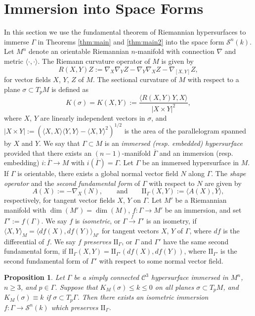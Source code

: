 \documentclass[11pt]{amsart}
\newtheorem{proposition}[theorem]{Proposition}
\theoremstyle{definition}
\newcommand{\ol}{\overline}
\newcommand{\C}{\mathcal{C}}
\newcommand{\ff}{\mathrm{I\!I}}
\begin{document}
\section{Immersion into Space Forms}\label{sec:immersion}
In this section we use the fundamental theorem of Riemannian hypersurfaces \cites{spivak:v4,dajczer1990} to immerse $\Gamma$ in Theorems \ref{thm:main} and \ref{thm:main2}  into the space form $\mathcal{S}^n(k)$.
Let $M^n$ denote an orientable Riemannian $n$-manifold with connection $\nabla$ and metric $\langle\cdot,\cdot\rangle$.
The Riemann curvature operator of $M$ is given by
$$
R(X,Y)Z:=\nabla_X\nabla_Y Z-\nabla_Y\nabla_X Z-\nabla_{[X,Y]}Z,
$$
for vector fields $X$, $Y$, $Z$ of $M$. The sectional curvature of $M$ with respect to a plane $\sigma\subset T_p M$ is defined as
$$
K(\sigma)=K(X,Y):=\frac{\langle R(X,Y)Y,X\rangle}{|X\times Y|^2},
$$
where $X$, $Y$  are linearly independent vectors in $\sigma$,  and $|X\times Y|:=(\langle X,X\rangle\langle Y,Y\rangle-\langle X,Y\rangle^2)^{1/2}$ is the area of the parallelogram spanned by $X$ and $Y$. We say that $\Gamma\subset M$ is an \emph{immersed (resp. embedded) hypersurface} provided that there exists an $(n-1)$-manifold $\ol\Gamma$ and an immersion  (resp. embedding) $i\colon\ol\Gamma\to M$ with $i(\ol\Gamma)=\Gamma$. Let $\Gamma$ be an immersed hypersurface in $M$. If $\Gamma$ is orientable, there exists a global normal vector field $N$ along $\Gamma$. The \emph{shape operator} and the \emph{second fundamental form} of $\Gamma$ with respect to $N$ are given by
$$
A(X):=-\nabla_X(N),\quad\quad\text{and}\quad\quad \ff_\Gamma(X,Y):=\langle A(X),Y\rangle,
$$
respectively, for tangent vector fields $X$, $Y$ on $\Gamma$. Let $M'$ be a Riemannian manifold with $\dim(M')=\dim(M)$, $f\colon\Gamma\to M'$ be an immersion, and set $\Gamma':=f(\Gamma)$. We say $f$ is \emph{isometric}, or $\Gamma\overset{f}{\to}\Gamma'$ is an isometry, if $\langle X, Y \rangle_M= \langle df(X), df(Y) \rangle_{M'}$ for tangent vectors $X$, $Y$ of $\Gamma$,  where $df$ is the differential of $f$. We say $f$ \emph{preserves} $\ff_\Gamma$,  or $\Gamma$ and $\Gamma'$ have the same second fundamental form, if  $\ff_{\Gamma}(X,Y)=\ff_{\Gamma'}(df(X), df(Y))$, where $\ff_{\Gamma'}$ is the second fundamental form of $\Gamma'$ with respect to some normal vector field.

\begin{proposition}\label{prop:embedding}
Let $\Gamma$ be a simply connected $\C^{3}$  hypersurface immersed in  $M^n$, $n\geq 3$, and $p\in\Gamma$. Suppose that $K_M(\sigma)\leq k\leq 0$ on all planes $\sigma\subset T_p M$, and  $K_{M}(\sigma)\equiv k$ if $\sigma\subset T_p\Gamma$. Then there exists an isometric immersion $f\colon\Gamma\to \mathcal{S}^n(k)$ which preserves $\ff_\Gamma$.
\end{proposition}
\end{document}
